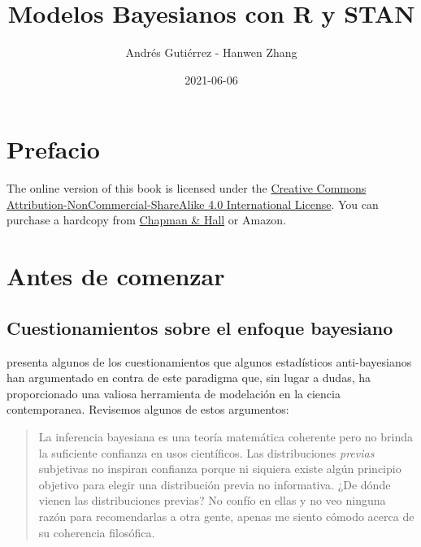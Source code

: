 \documentclass[
  10pt,
  spanish,
]{book}
\title{Modelos Bayesianos con R y STAN}
\author{Andrés Gutiérrez - Hanwen Zhang}
\date{2021-06-06}
\theoremstyle{definition}
\theoremstyle{definition}
\theoremstyle{definition}
\theoremstyle{definition}
\theoremstyle{remark}
\begin{document}
\maketitle

{
\hypersetup{linkcolor=}
\setcounter{tocdepth}{1}
\tableofcontents
}
\listoftables
\listoffigures
\hypertarget{prefacio}{%
\chapter*{Prefacio}\label{prefacio}}

The online version of this book is licensed under the \href{http://creativecommons.org/licenses/by-nc-sa/4.0/}{Creative Commons Attribution-NonCommercial-ShareAlike 4.0 International License}. You can purchase a hardcopy from \href{https://www.crcpress.com/product/isbn/9781138700109}{Chapman \& Hall} or Amazon.

\hypertarget{antes-de-comenzar}{%
\chapter*{Antes de comenzar}\label{antes-de-comenzar}}

\hypertarget{cuestionamientos-sobre-el-enfoque-bayesiano}{%
\section*{Cuestionamientos sobre el enfoque bayesiano}\label{cuestionamientos-sobre-el-enfoque-bayesiano}}

\citet{GelmanObjections} presenta algunos de los cuestionamientos que algunos estadísticos anti-bayesianos han argumentado en contra de este paradigma que, sin lugar a dudas, ha proporcionado una valiosa herramienta de modelación en la ciencia contemporanea. Revisemos algunos de estos argumentos:

\begin{quote}
La inferencia bayesiana es una teoría matemática coherente pero no brinda la suficiente confianza en usos científicos. Las distribuciones \emph{previas} subjetivas no inspiran confianza porque ni siquiera existe algún principio objetivo para elegir una distribución previa no informativa. ¿De dónde vienen las distribuciones previas? No confío en ellas y no veo ninguna razón para recomendarlas a otra gente, apenas me siento cómodo acerca de su coherencia filosófica.
\end{quote}
\end{document}
